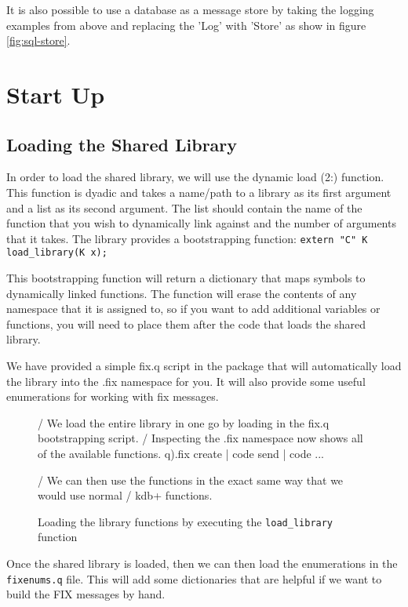 It is also possible to use a database as a message store by taking the logging examples from above
and replacing the 'Log' with 'Store' as show in figure \ref{fig:sql-store}.

\section{Start Up}

\subsection{Loading the Shared Library}
In order to load the shared library, we will use the dynamic load (2:) function. This function is dyadic
and takes a name/path to a library as its first argument and a list as its second argument. The list should
contain the name of the function that you wish to dynamically link against and the number of arguments that
it takes. The library provides a bootstrapping function: \texttt{extern "C" K load_library(K x);}

This bootstrapping function will return a dictionary that maps symbols to dynamically linked functions. The
function will erase the contents of any namespace that it is assigned to, so if you want to add additional
variables or functions, you will need to place them after the code that loads the shared library.

We have provided a simple fix.q script in the package that will automatically load the library into the .fix namespace for you. It will also provide some useful enumerations
for working with fix messages.

\begin{figure}[H]
\begin{qcode}
/ We load the entire library in one go by loading in the fix.q bootstrapping script.
/ Inspecting the .fix namespace now shows all of the available functions.
q).fix
create               | code
send                 | code
...

/ We can then use the functions in the exact same way that we would use normal
/ kdb+ functions.
\end{qcode}
\caption{Loading the library functions by executing the \texttt{load_library} function}
\end{figure}

Once the shared library is loaded, then we can then load the enumerations in the \verb|fixenums.q| file. This will add some dictionaries that are helpful if we want
to build the FIX messages by hand.

